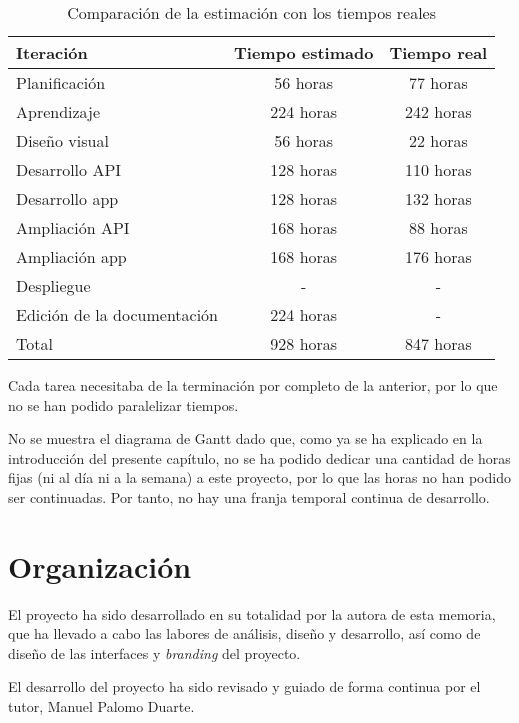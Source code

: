 \begin{table}[hbtp]
  \centering
  \begin{tabular}{|l|c|c|}
    \hline
    \textbf{Iteración} & \textbf{Tiempo estimado} & \textbf{Tiempo real} \\
    \hline
    Planificación & 56 horas & 77 horas \\
    \hline
    Aprendizaje & 224 horas & 242 horas \\
    \hline
    Diseño visual & 56 horas & 22 horas \\
    \hline
    Desarrollo API & 128 horas & 110 horas \\
    \hline
    Desarrollo app & 128 horas & 132 horas \\
    \hline
    Ampliación API & 168 horas & 88 horas \\
    \hline
    Ampliación app & 168 horas & 176 horas \\
    \hline
    Despliegue & - & - \\
    \hline
    Edición de la documentación & 224 horas & - \\
    \hline
    Total & 928 horas & 847 horas \\
    \hline
  \end{tabular}
  \caption{Comparación de la estimación con los tiempos reales}
  \label{tab:estimacion_tiempo}
\end{table}

Cada tarea necesitaba de la terminación por completo de la anterior, por lo que
no se han podido paralelizar tiempos.

No se muestra el diagrama de Gantt dado que, como ya se ha explicado en la
introducción del presente capítulo, no se ha podido dedicar una cantidad de horas
fijas (ni al día ni a la semana) a este proyecto, por lo que las horas no han
podido ser continuadas. Por tanto, no hay una franja temporal continua de
desarrollo.

\section{Organización}

El proyecto ha sido desarrollado en su totalidad por la autora de esta memoria,
que ha llevado a cabo las labores de análisis, diseño y desarrollo, así como de
diseño de las interfaces y \textit{branding} del proyecto.

El desarrollo del proyecto ha sido revisado y guiado de forma continua por el
tutor, Manuel Palomo Duarte.

